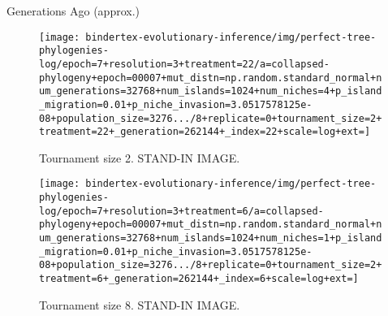 \begin{figure*}
  \centering
  \begin{minipage}{\textwidth}
    \centering
    Generations Ago (approx.)
  \end{minipage}
  \begin{minipage}{\textwidth}
    \hspace{0.02\linewidth}
    \hfill
    \hfill
    \hfill
    \hfill
  \end{minipage}
  \begin{subfigure}[t]{\linewidth}
    \centering
  \texttt{[image: bindertex-evolutionary-inference/img/perfect-tree-phylogenies-log/epoch=7+resolution=3+treatment=22/a=collapsed-phylogeny+epoch=00007+mut\_distn=np.random.standard\_normal+num\_generations=32768+num\_islands=1024+num\_niches=4+p\_island\_migration=0.01+p\_niche\_invasion=3.0517578125e-08+population\_size=3276.../8+replicate=0+tournament\_size=2+treatment=22+\_generation=262144+\_index=22+scale=log+ext=]}
    \caption{%
    Tournament size 2.
    STAND-IN IMAGE.
    }
    \label{fig:wse-phylogenies-tsize2}
  \end{subfigure}

  \begin{subfigure}[t]{\linewidth}
    \centering
\texttt{[image: bindertex-evolutionary-inference/img/perfect-tree-phylogenies-log/epoch=7+resolution=3+treatment=6/a=collapsed-phylogeny+epoch=00007+mut\_distn=np.random.standard\_normal+num\_generations=32768+num\_islands=1024+num\_niches=1+p\_island\_migration=0.01+p\_niche\_invasion=3.0517578125e-08+population\_size=3276.../8+replicate=0+tournament\_size=2+treatment=6+\_generation=262144+\_index=6+scale=log+ext=]}
    \caption{%
      Tournament size 8.
      STAND-IN IMAGE.
    }
    \label{fig:wse-phylogenies-tsize8}
  \end{subfigure}

\caption{%
\textbf{Phylogenies from on-hardware experiment.}
Subfigures \ref{fig:wse-phylogenies-tsize2} and \ref{fig:wse-phylogenies-tsize8} contrast phylogenies from experiments with lower and higher selection pressure, respectively.
Note the recognizable decrease in phylogenetic richness under high selection pressure.
Each phylogeny subsampled to 131,072 taxa.
}
\label{fig:wse-phylogenies}

\end{figure*}

